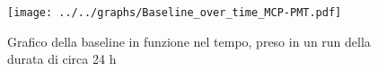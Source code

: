 \begin{figure}[h] \centering \texttt{[image: ../../graphs/Baseline\_over\_time\_MCP-PMT.pdf]}\caption{Grafico della baseline in funzione nel tempo, preso in un run della durata di circa 24 h}\label{gr:Baseline_over_time_MCP-PMT} \end{figure}
